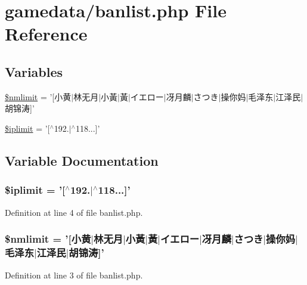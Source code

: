 \hypertarget{banlist_8php}{\section{gamedata/banlist.php File Reference}
\label{banlist_8php}
}
\subsection*{Variables}
\begin{DoxyCompactItemize}
\item 
\hyperlink{banlist_8php_ac6d476c723a53fe2881de497ab9f53a4}{\$nmlimit} = '\mbox{[}小黄$\vert$林无月$\vert$小黃$\vert$黃$\vert$イエロー$\vert$冴月麟$\vert$さつき$\vert$操你妈$\vert$毛泽东$\vert$江泽民$\vert$胡锦涛\mbox{]}'
\item 
\hyperlink{banlist_8php_a310121f5d3ec43f5cfb1cf78d31814ec}{\$iplimit} = '\mbox{[}$^\wedge$192.$\vert$$^\wedge$118...\mbox{]}'
\end{DoxyCompactItemize}


\subsection{Variable Documentation}
\hypertarget{banlist_8php_a310121f5d3ec43f5cfb1cf78d31814ec}{
\subsubsection[{\$iplimit}]{\setlength{\rightskip}{0pt plus 5cm}\$iplimit = '\mbox{[}$^\wedge$192.$\vert$$^\wedge$118...\mbox{]}'}}\label{banlist_8php_a310121f5d3ec43f5cfb1cf78d31814ec}


Definition at line 4 of file banlist.\+php.

\hypertarget{banlist_8php_ac6d476c723a53fe2881de497ab9f53a4}{
\subsubsection[{\$nmlimit}]{\setlength{\rightskip}{0pt plus 5cm}\$nmlimit = '\mbox{[}小黄$\vert$林无月$\vert$小黃$\vert$黃$\vert$イエロー$\vert$冴月麟$\vert$さつき$\vert$操你妈$\vert$毛泽东$\vert$江泽民$\vert$胡锦涛\mbox{]}'}}\label{banlist_8php_ac6d476c723a53fe2881de497ab9f53a4}


Definition at line 3 of file banlist.\+php.

